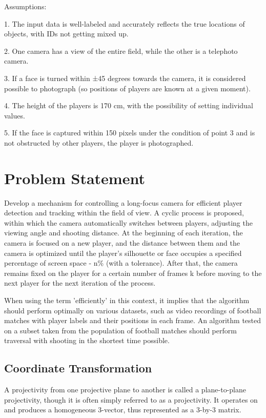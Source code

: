 Assumptions:

1. The input data is well-labeled and accurately reflects the true locations of objects, with IDs not getting mixed up.

2. One camera has a view of the entire field, while the other is a telephoto camera.

3. If a face is turned within ±45 degrees towards the camera, it is considered possible to photograph (so positions of players are known at a given moment).

4. The height of the players is 170 cm, with the possibility of setting individual values.

5. If the face is captured within 150 pixels under the condition of point 3 and is not obstructed by other players, the player is photographed.

\section{Problem Statement}

Develop a mechanism for controlling a long-focus camera for efficient player detection and tracking within the field of view. A cyclic process is proposed, within which the camera automatically switches between players, adjusting the viewing angle and shooting distance. At the beginning of each iteration, the camera is focused on a new player, and the distance between them and the camera is optimized until the player's silhouette or face occupies a specified percentage of screen space - n\% (with a tolerance). After that, the camera remains fixed on the player for a certain number of frames k before moving to the next player for the next iteration of the process.

When using the term 'efficiently' in this context, it implies that the algorithm should perform optimally on various datasets, such as video recordings of football matches with player labels and their positions in each frame. An algorithm tested on a subset taken from the population of football matches should perform traversal with shooting in the shortest time possible.

\subsection{Coordinate Transformation}
A projectivity from one projective plane to another is called a plane-to-plane projectivity, though it is often simply referred to as a projectivity. It operates on and produces a homogeneous 3-vector, thus represented as a 3-by-3 matrix.

